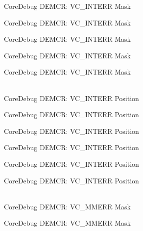 \begin{DoxyRefList}
\label{deprecated__deprecated000202}%
%
Core\+Debug DEMCR:\+ VC\+\_\+\+INTERR Mask 

\label{deprecated__deprecated000344}%
%
Core\+Debug DEMCR:\+ VC\+\_\+\+INTERR Mask 

\label{deprecated__deprecated000420}%
%
Core\+Debug DEMCR:\+ VC\+\_\+\+INTERR Mask 

\label{deprecated__deprecated000509}%
%
Core\+Debug DEMCR:\+ VC\+\_\+\+INTERR Mask 

\label{deprecated__deprecated000611}%
%
Core\+Debug DEMCR:\+ VC\+\_\+\+INTERR Mask  
\item[{\parbox[t]{\linewidth}{Global \doxylink{group__CMSIS__CoreDebug_ga22079a6e436f23b90308be97e19cf07e}{Core\+Debug\+\_\+\+DEMCR\+\_\+\+VC\+\_\+\+INTERR\+\_\+\+Pos} }}]\hfill \\
\label{deprecated__deprecated000057}%
%
Core\+Debug DEMCR:\+ VC\+\_\+\+INTERR Position 

\label{deprecated__deprecated000201}%
%
Core\+Debug DEMCR:\+ VC\+\_\+\+INTERR Position 

\label{deprecated__deprecated000343}%
%
Core\+Debug DEMCR:\+ VC\+\_\+\+INTERR Position 

\label{deprecated__deprecated000419}%
%
Core\+Debug DEMCR:\+ VC\+\_\+\+INTERR Position 

\label{deprecated__deprecated000508}%
%
Core\+Debug DEMCR:\+ VC\+\_\+\+INTERR Position 

\label{deprecated__deprecated000610}%
%
Core\+Debug DEMCR:\+ VC\+\_\+\+INTERR Position  
\item[{\parbox[t]{\linewidth}{Global \doxylink{group__CMSIS__CoreDebug_gad420a9b60620584faaca6289e83d3a87}{Core\+Debug\+\_\+\+DEMCR\+\_\+\+VC\+\_\+\+MMERR\+\_\+\+Msk} }}]\hfill \\
\label{deprecated__deprecated000068}%
%
Core\+Debug DEMCR:\+ VC\+\_\+\+MMERR Mask 

\label{deprecated__deprecated000212}%
%
Core\+Debug DEMCR:\+ VC\+\_\+\+MMERR Mask 


\end{DoxyRefList}
